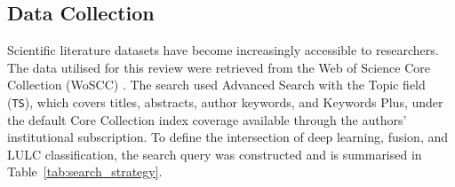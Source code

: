 \documentclass[]{interact}
\theoremstyle{plain}%
\theoremstyle{definition}
\theoremstyle{remark}
\DeclareRobustCommand{\DIFadd}[1]{{\protect\color{DIFaddcolor}\uwave{#1}}}
\DeclareRobustCommand{\DIFdel}[1]{{\protect\color{DIFdelcolor}\sout{#1}}}
\def\DIFadd#1{#1}%
\def\DIFdel#1{}%
\begin{document}
\subsection{Data Collection}
\label{sec:data_collection} 
\DIFdel{In} \DIFdel{the} \DIFdel{contemporary} \DIFdel{era}\DIFdel{,} \DIFdel{scientific}
\DIFadd{Scientific} literature datasets have become increasingly accessible to researchers. The \DIFdel{Web} \DIFdel{of} \DIFdel{Science} \DIFdel{(}\DIFdel{WoS}\DIFdel{)} \DIFdel{is} \DIFdel{widely} \DIFdel{recognized} \DIFdel{as} \DIFdel{one} \DIFdel{of} \DIFdel{the} \DIFdel{most} \DIFdel{authoritative} \DIFdel{and} \DIFdel{representative} \DIFdel{scientific} \DIFdel{databases} \DIFdel{globally}\DIFdel{.} \DIFdel{Therefore}\DIFdel{,} \DIFdel{the} data \DIFdel{utilized} \DIFadd{utilised} for this review were \DIFdel{primarily} retrieved from the \DIFdel{WoS} \DIFadd{Web} \DIFadd{of} \DIFadd{Science} Core Collection \DIFadd{(}\DIFadd{WoSCC}\DIFadd{)} \citep{11}. \DIFdel{To} \DIFdel{comprehensively} \DIFdel{cover} \DIFdel{various} \DIFdel{models} \DIFdel{and} \DIFdel{simulation} \DIFdel{studies} \DIFdel{related} \DIFdel{to} \DIFdel{LULC} \DIFadd{The} \DIFadd{search} \DIFadd{used} \DIFadd{Advanced} \DIFadd{Search} \DIFadd{with} \DIFadd{the} \DIFadd{Topic} \DIFadd{field} \DIFadd{(}\texttt{\DIFadd{TS}}\DIFadd{)}\DIFadd{,} \DIFadd{which} \DIFadd{covers} \DIFadd{titles}\DIFadd{,} \DIFadd{abstracts}\DIFadd{,} \DIFadd{author} \DIFadd{keywords}, and \DIFdel{to} \DIFdel{clearly} \DIFadd{Keywords} \DIFadd{Plus}\DIFadd{,} \DIFadd{under} \DIFadd{the} \DIFadd{default} \DIFadd{Core} \DIFadd{Collection} \DIFadd{index} \DIFadd{coverage} \DIFadd{available} \DIFadd{through} \DIFadd{the} \DIFadd{authors'} \DIFadd{institutional} \DIFadd{subscription}\DIFadd{.} \DIFadd{To} define the \DIFdel{research} \DIFdel{scope} \DIFadd{intersection} of \DIFdel{the} \DIFdel{field} \DIFadd{deep} \DIFadd{learning}\DIFadd{,} \DIFadd{fusion}\DIFadd{,} \DIFadd{and} \DIFadd{LULC} \DIFadd{classification}, the search query was constructed and is \DIFdel{summarized} \DIFadd{summarised} in Table~\ref{tab:search_strategy}.

\DIFdel{Considering} \DIFdel{that}
\end{document}
